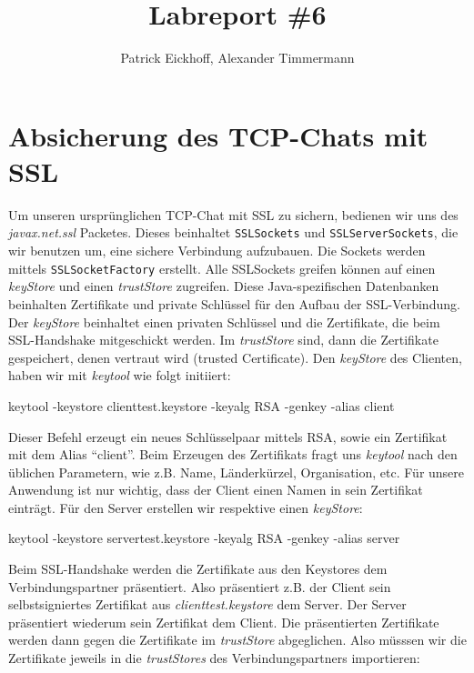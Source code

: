 \documentclass[a4paper,12bpt]{scrartcl}
\author{Patrick Eickhoff, Alexander Timmermann}
\title{Labreport \#6}
\date{}
\begin{document}
\maketitle

\onehalfspace

\section{Absicherung des TCP-Chats mit SSL}
\label{sec:tcp_chat}

Um unseren ursprünglichen TCP-Chat mit SSL zu sichern, bedienen wir uns des \textit{javax.net.ssl}
Packetes. Dieses beinhaltet \texttt{SSLSockets} und \texttt{SSLServerSockets}, die wir benutzen um, eine sichere
Verbindung aufzubauen. Die Sockets werden mittels \texttt{SSLSocketFactory} erstellt.
Alle SSLSockets greifen können auf einen \textit{keyStore} und einen \textit{trustStore} zugreifen.
Diese Java-spezifischen Datenbanken beinhalten Zertifikate und private Schlüssel für den Aufbau der
SSL-Verbindung. Der \textit{keyStore}  beinhaltet einen privaten Schlüssel und die Zertifikate, die
beim SSL-Handshake mitgeschickt werden. Im \textit{trustStore} sind, dann die Zertifikate gespeichert,
denen vertraut wird (trusted Certificate). Den \textit{keyStore} des Clienten, haben wir
mit \textit{keytool} wie folgt initiiert:

\begin{usercommands}
keytool -keystore clienttest.keystore -keyalg RSA -genkey -alias client
\end{usercommands}

Dieser Befehl erzeugt ein neues Schlüsselpaar mittels RSA, sowie ein Zertifikat mit dem Alias
``client''. Beim Erzeugen des Zertifikats fragt uns \textit{keytool} nach den üblichen Parametern,
wie z.B. Name, Länderkürzel, Organisation, etc. Für unsere Anwendung ist nur wichtig, dass
der Client einen Namen in sein Zertifikat einträgt. Für den Server erstellen wir respektive
einen \textit{keyStore}:

\begin{usercommands}
keytool -keystore servertest.keystore -keyalg RSA -genkey -alias server
\end{usercommands}

Beim SSL-Handshake werden die Zertifikate aus den Keystores dem Verbindungspartner präsentiert.
Also präsentiert z.B. der Client sein selbstsigniertes Zertifikat aus \textit{clienttest.keystore}
dem Server. Der Server präsentiert wiederum sein Zertifikat dem Client.
Die präsentierten Zertifikate werden dann gegen die Zertifikate im \textit{trustStore}
abgeglichen. Also müsssen wir die Zertifikate jeweils in die \textit{trustStores} des
Verbindungspartners importieren:
\end{document}
